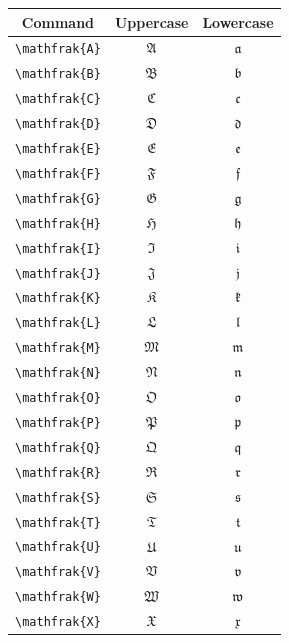 \documentclass[12pt,a4paper]{article}
\begin{document}
\begin{longtable}{|c|c|c|}
\hline
\textbf{Command} & \textbf{Uppercase} & \textbf{Lowercase} \\
\hline
\verb|\mathfrak{A}| & $\mathfrak{A}$ & $\mathfrak{a}$ \\ %
\verb|\mathfrak{B}| & $\mathfrak{B}$ & $\mathfrak{b}$ \\ %
\verb|\mathfrak{C}| & $\mathfrak{C}$ & $\mathfrak{c}$ \\ %
\verb|\mathfrak{D}| & $\mathfrak{D}$ & $\mathfrak{d}$ \\ %
\verb|\mathfrak{E}| & $\mathfrak{E}$ & $\mathfrak{e}$ \\ %
\verb|\mathfrak{F}| & $\mathfrak{F}$ & $\mathfrak{f}$ \\ %
\verb|\mathfrak{G}| & $\mathfrak{G}$ & $\mathfrak{g}$ \\ %
\verb|\mathfrak{H}| & $\mathfrak{H}$ & $\mathfrak{h}$ \\ %
\verb|\mathfrak{I}| & $\mathfrak{I}$ & $\mathfrak{i}$ \\ %
\verb|\mathfrak{J}| & $\mathfrak{J}$ & $\mathfrak{j}$ \\ %
\verb|\mathfrak{K}| & $\mathfrak{K}$ & $\mathfrak{k}$ \\ %
\verb|\mathfrak{L}| & $\mathfrak{L}$ & $\mathfrak{l}$ \\ %
\verb|\mathfrak{M}| & $\mathfrak{M}$ & $\mathfrak{m}$ \\ %
\verb|\mathfrak{N}| & $\mathfrak{N}$ & $\mathfrak{n}$ \\ %
\verb|\mathfrak{O}| & $\mathfrak{O}$ & $\mathfrak{o}$ \\ %
\verb|\mathfrak{P}| & $\mathfrak{P}$ & $\mathfrak{p}$ \\ %
\verb|\mathfrak{Q}| & $\mathfrak{Q}$ & $\mathfrak{q}$ \\ %
\verb|\mathfrak{R}| & $\mathfrak{R}$ & $\mathfrak{r}$ \\ %
\verb|\mathfrak{S}| & $\mathfrak{S}$ & $\mathfrak{s}$ \\ %
\verb|\mathfrak{T}| & $\mathfrak{T}$ & $\mathfrak{t}$ \\ %
\verb|\mathfrak{U}| & $\mathfrak{U}$ & $\mathfrak{u}$ \\ %
\verb|\mathfrak{V}| & $\mathfrak{V}$ & $\mathfrak{v}$ \\ %
\verb|\mathfrak{W}| & $\mathfrak{W}$ & $\mathfrak{w}$ \\ %
\verb|\mathfrak{X}| & $\mathfrak{X}$ & $\mathfrak{x}$ \\ %

\end{longtable}
\end{document}
